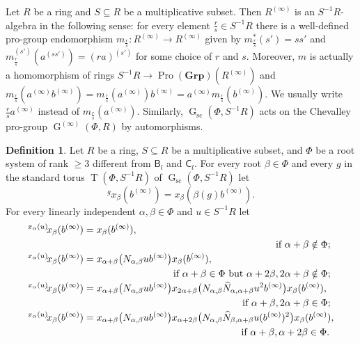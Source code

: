 \documentclass{article}
\numberwithin{equation}{section}
\theoremstyle{definition}
\newtheorem{df}[lemma]{Definition} \Crefname{df}{Definition}{Definitions}
\theoremstyle{remark}
\DeclareMathOperator\GG{G}
\DeclareMathOperator\Torus{T}
\DeclareMathOperator{\Pro}{Pro}
\newcommand{\Group}{\mathbf{Grp}}
\newcommand{\up}[2]{{^{#1}\!{#2}}}
\newcommand{\rB}{\mathsf{B}}
\newcommand{\rC}{\mathsf{C}}
\begin{document}
Let \(R\) be a ring and \(S \subseteq R\) be a multiplicative subset. Then \(R^{(\infty)}\) is an \(S^{-1} R\)-algebra in the following sense: for every element \(\frac rs \in S^{-1} R\) there is a well-defined pro-group endomorphism \(m_{\frac rs} \colon R^{(\infty)} \to R^{(\infty)}\) given by \(m_{\frac rs}^*(s') = ss'\) and \(m_{\frac rs}^{(s')}(a^{(ss')}) = (ra)^{(s')}\) for some choice of \(r\) and \(s\). Moreover, \(m\) is actually a homomorphism of rings \(S^{-1} R \to \Pro(\Group)(R^{(\infty)})\) and \(m_{\frac rs}(a^{(\infty)} b^{(\infty)}) = m_{\frac rs}(a^{(\infty)}) b^{(\infty)} = a^{(\infty)} m_{\frac rs}(b^{(\infty)})\). We usually write \(\frac rs a^{(\infty)}\) instead of \(m_{\frac rs}(a^{(\infty)})\). Similarly, \(\GG_{\mathrm{sc}}(\Phi, S^{-1} R)\) acts on the Chevalley pro-group \(\GG^{(\infty)}(\Phi, R)\) by automorphisms.

\begin{df}\label{root-action}
 Let \(R\) be a ring, \(S \subseteq R\) be a multiplicative subset, and \(\Phi\) be a root system of rank \(\geq 3\) different from \(\rB_l\) and \(\rC_l\). For every root \(\beta \in \Phi\) and every \(g\) in the standard torus \(\Torus(\Phi, S^{-1} R)\) of \(\GG_{\mathrm{sc}}(\Phi, S^{-1} R)\) let
 \[\up g{x_\beta(b^{(\infty)})} = x_\beta(\beta(g) b^{(\infty)}).\]
 For every linearly independent \(\alpha, \beta \in \Phi\) and \(u \in S^{-1} R\) let
 \begin{align*}
 \up{x_\alpha(u)}{x_\beta(b^{(\infty)})}
 &= x_\beta(b^{(\infty)}), \\
 \multispan2{\hfil if $\alpha + \beta \notin \Phi$;} \\
 \up{x_\alpha(u)}{x_\beta(b^{(\infty)})}
 &= x_{\alpha + \beta}\bigl(N_{\alpha, \beta} u b^{(\infty)}\bigr)
  x_\beta(b^{(\infty)}), \\
 \multispan2{\hfill if $\alpha + \beta \in \Phi$ but $\alpha + 2\beta, 2\alpha + \beta \notin \Phi$;} \\
 \up{x_\alpha(u)}{x_\beta(b^{(\infty)})}
 &= x_{\alpha + \beta}\bigl(N_{\alpha, \beta} u b^{(\infty)}\bigr)
  x_{2\alpha + \beta}\bigl(N_{\alpha, \beta} \widehat N_{\alpha, \alpha + \beta} u^2 b^{(\infty)}\bigr)
  x_\beta(b^{(\infty)}), \\
 \multispan2{\hfill if $\alpha + \beta, 2\alpha + \beta \in \Phi$;} \\
 \up{x_\alpha(u)}{x_\beta(b^{(\infty)})}
 &= x_{\alpha + \beta}\bigl(N_{\alpha, \beta} u b^{(\infty)}\bigr)
  x_{\alpha + 2\beta}\bigl(N_{\alpha, \beta} \widehat N_{\beta, \alpha + \beta} u (b^{(\infty)})^2\bigr)
  x_\beta(b^{(\infty)}), \\
 \multispan2{\hfill if $\alpha + \beta, \alpha + 2\beta \in \Phi$.}
 \end{align*} 
\end{df}
\end{document}
